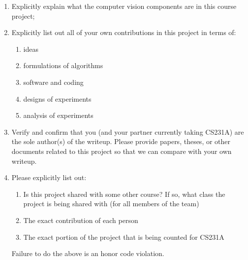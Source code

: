 \documentclass[10pt,twocolumn,letterpaper]{article}
\begin{document}
\begin{enumerate}
\item  Explicitly explain what the computer vision components are in this course project;
\item  Explicitly list out all of your own contributions in this project in terms of:
	\begin{enumerate}
	\item ideas
	\item formulations of algorithms
 	\item software and coding
	\item designs of experiments
	\item analysis of experiments
	\end{enumerate}
\item Verify and confirm that you (and your partner currently taking CS231A) are the sole author(s) of the writeup.
Please provide papers, theses, or other documents related to this project so that we can compare with your own writeup.
\item Please explicitly list out:
	\begin{enumerate}
	\item Is this project shared with some other course? If so, what class the project is being shared with (for all members of the team)
	\item The exact contribution of each person
	\item The exact portion of the project that is being counted for CS231A
	\end{enumerate}
	Failure to do the above is an honor code violation.
\end{enumerate}
\end{document}
